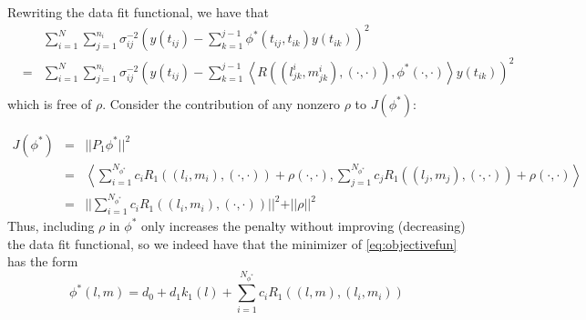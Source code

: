 \documentclass[12pt]{article}
\theoremstyle{definition}
\begin{document}
Rewriting the data fit functional, we have that  
 \begin{eqnarray*}
&\mbox{ }&\sum_{i=1}^N \sum_{j=1}^{n_i} \sigma_{ij}^{-2} \left(y\left(t_{ij}\right) - \sum_{k=1}^{j-1} \phi^*\left(t_{ij}, t_{ik}  \right) y\left(t_{ik}\right)  \right)^2  \\ 
&=& \sum_{i=1}^N \sum_{j=1}^{n_i} \sigma_{ij}^{-2} \left(y\left(t_{ij}\right) - \sum_{k=1}^{j-1} \left< R\left(\left(l^i_{jk},m^i_{jk}\right),\left(\cdot,\cdot\right) \right),\phi^*\left(\cdot,\cdot\right)\right> y\left(t_{ik}\right)  \right)^2  \\
 \end{eqnarray*}
\noindent
which is free of $\rho$. Consider the contribution of any nonzero $\rho$ to $J\left(\phi^*\right)$: 
  
 \begin{eqnarray*}
 J\left(\phi^*\right) &=& \vert \vert  P_1\phi^* \vert \vert^2\\
 &=& \left< \sum_{i=1}^{N_{\phi^*}}  c_i R_1\left( \left(l_i,m_i\right),\left(\cdot,\cdot\right) \right) + \rho\left(\cdot,\cdot \right), \sum_{j=1}^{N_{\phi^*}} c_j R_1\left( \left(l_j,m_j\right),\left(\cdot,\cdot\right) \right) + \rho\left(\cdot,\cdot\right)\right> \\
 &=& \vert \vert \sum_{i=1}^{N_{\phi^*}}  c_i R_1\left(\left(l_i,m_i\right),\left(\cdot,\cdot\right) \right) \vert \vert^2 + \vert \vert  \rho \vert \vert^2 
 \end{eqnarray*}
\noindent
Thus, including $\rho$ in $\phi^*$ only increases the penalty without improving (decreasing) the data fit functional, so we indeed have that the minimizer of \eqref{eq:objectivefun} has the form
\begin{equation}
 \phi^*\left(l,m\right) =  d_0 + d_1k_1\left(l\right) + \sum_{i=1}^{N_{\phi^*}} c_i R_1\left( \left(l,m\right) , \left(l_i,m_i \right)\right)
 \label{eq:finitedimsolution}
 \end{equation}





\end{document}
